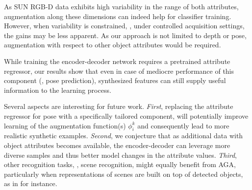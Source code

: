 \documentclass[10pt,twocolumn,letterpaper]{article}
\begin{document}
As SUN RGB-D data exhibits high variability in the range 
of both attributes, augmentation along these dimensions can 
indeed help for classifier training. However, when variability
is constrained, \eg, under controlled acquisition 
settings, the gains may be less apparent. As our approach 
is not limited to depth or pose, augmentation with respect
to other object attributes would be required.

While training the encoder-decoder network requires 
a pretrained attribute regressor, our results show 
that even in case of mediocre performance of this component 
(\eg, pose prediction), synthesized features can still 
supply useful information to the learning process. 

Several aspects are interesting for future work. \emph{First},
replacing the attribute regressor for pose with a specifically
tailored component, will potentially improve learning of the
augmentation function(s) $\phi_i^k$ and consequently lead to
more realistic synthetic examples. \emph{Second}, we conjecture
that as additional data with object attributes becomes available, 
the encoder-decoder can leverage more diverse samples and 
thus better model changes in the attribute values. 
\emph{Third}, other recognition tasks, \eg, scene recognition,
might equally benefit from AGA, particularly when representations
of scenes are built on top of detected objects, as in \cite{Dixit16a}
for instance.


{\small


}
\end{document}
